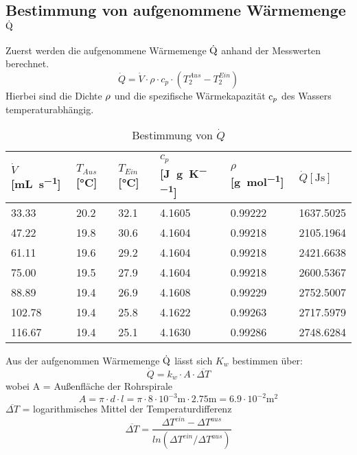 \documentclass[12pt]{article}
\begin{document}
\subsection{Bestimmung von aufgenommene Wärmemenge $\ce{\dot{Q}}$ }
Zuerst werden die aufgenommene Wärmemenge $\ce{\dot{Q}}$ anhand der Messwerten berechnet.
\begin{equation}
  \dot Q = \dot V \cdot \rho \cdot c _p \cdot (T_2^{Aus}-T_2^{Ein})
\end{equation}
Hierbei sind die Dichte $\ce{\rho}$ \cite{crc1} und die spezifische
Wärmekapazität $\ce{c_p}$ \cite{nist} des Wassers temperaturabhängig.
\begin{table}[ht!]
  \centering
 \begin{tabularx}{\textwidth}{XXXXXX}
 $\dot V$ [\si{\milli\liter\per\second}] & $T _{Aus}$ [\si{\celsius}] &  $T _{Ein}$ [\si{\celsius}] & $c _p$ [\si{\joule\per\gram\per\kelvin}]
 & $\rho$ [\si{\gram\per\mol}] & $\dot Q [\si{\joule\second}] $\\
\hline
33.33  & 20.2 & 32.1 & 4.1605 & 0.99222 &1637.5025 \\
47.22  & 19.8 & 30.6 & 4.1604 & 0.99218 &2105.1964 \\
61.11  & 19.6 & 29.2 & 4.1604 & 0.99218 &2421.6638 \\
75.00  & 19.5 & 27.9 & 4.1604 & 0.99218 &2600.5367 \\
88.89  & 19.4 & 26.9 & 4.1608 & 0.99229 &2752.5007 \\
102.78 & 19.4 & 25.8 & 4.1622 & 0.99263 &2717.5979 \\
116.67 & 19.4 & 25.1 & 4.1630 & 0.99286 &2748.6284 \\
\end{tabularx}
  \caption{Bestimmung von $\dot Q$}
\end{table}
Aus der aufgenommen Wärmemenge $\ce{\dot{Q}}$ lässt sich $K _w$ bestimmen über:
\begin{equation}
  \dot Q = k _w \cdot A \cdot \overline{\Delta T}
\end{equation}
wobei A = Außenfläche der Rohrspirale
 \begin{equation}
   A = \pi \cdot d \cdot l = \pi \cdot 8 \cdot 10^{-3} \si{\meter} \cdot 2.75 \si{\meter} = 6.9 \cdot 10^{-2} \si{\square\meter}
 \end{equation}
 $ \overline{\Delta T}$ = logarithmisches Mittel der Temperaturdifferenz
 \begin{equation}
   \overline{\Delta T} = \frac{\Delta T^{ein}-\Delta T^{aus}}{ln(\Delta T^{ein}/\Delta T^{aus})}
 \end{equation}
\end{document}
